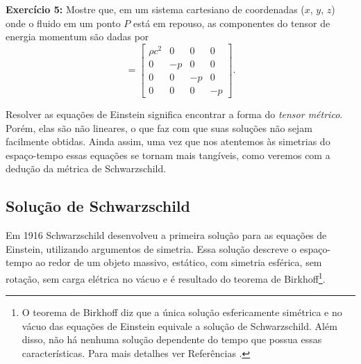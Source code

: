 \documentclass[12pt,a4paper,titlepage,brazil]{article}
\begin{document}
\begin{tcolorbox}
  {\bf Exercício 5:} Mostre que, em um sistema cartesiano de coordenadas ($x$, $y$, $z$) onde o fluido em um ponto $P$ está em repouso, as componentes do tensor de energia momentum são dadas por
  \begin{equation}
  [T_{\mu \nu}] = \left[\begin{array}{cccc}
                          \rho c^2 & 0 & 0 & 0\\
                          0 & - p & 0 & 0 \\
                          0 & 0 & - p & 0 \\
                          0 & 0 & 0 & - p
                                      \end{array}\right] . \label{eq:Tmunu}  
                                  \end{equation}
\end{tcolorbox}

Resolver as equações de Einstein significa encontrar a forma do \textit{tensor métrico}. Porém, elas são não lineares, o que faz com que suas soluções não sejam facilmente obtidas. Ainda assim, uma vez que nos atentemos às simetrias do espaço-tempo essas equações se tornam mais tangíveis, como veremos com a dedução da métrica de Schwarzschild.


\subsection{Solução de Schwarzschild}

Em 1916 Schwarzschild desenvolveu a primeira solução para as equações de Einstein, utilizando argumentos de simetria. Essa solução descreve o espaço-tempo ao redor de um objeto massivo, estático, com simetria esférica, sem rotação, sem carga elétrica no vácuo e é resultado do teorema de Birkhoff\footnote{O teorema de Birkhoff diz que a única solução esfericamente simétrica e no vácuo das equações de Einstein equivale a solução de Schwarzschild. Além disso, não há nenhuma solução dependente do tempo que possua essas características. Para mais detalhes ver Referências \cite{carroll2004, hartle2003, wald2010}.}.
\end{document}
